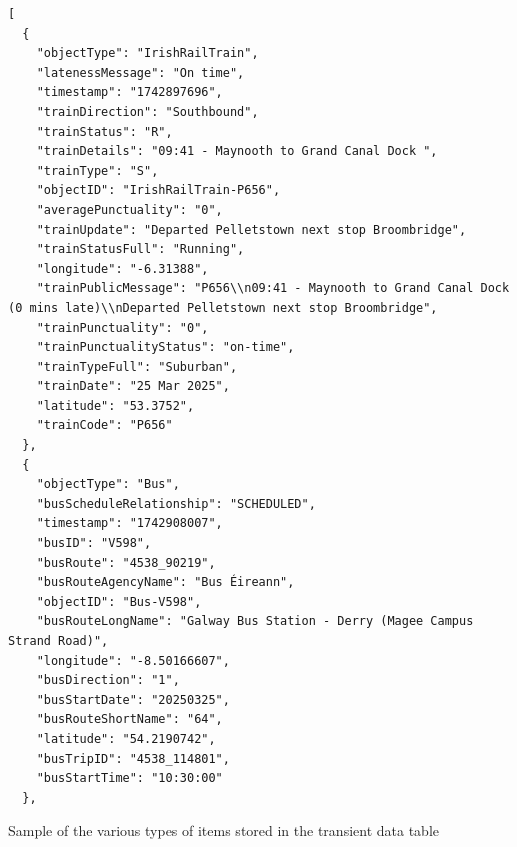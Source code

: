 \documentclass[a4paper,11pt]{report}
\newenvironment{code}{\captionsetup{type=listing}}{}
\begin{document}
\begin{code}
\begin{verbatim}
[
  {
    "objectType": "IrishRailTrain",
    "latenessMessage": "On time",
    "timestamp": "1742897696",
    "trainDirection": "Southbound",
    "trainStatus": "R",
    "trainDetails": "09:41 - Maynooth to Grand Canal Dock ",
    "trainType": "S",
    "objectID": "IrishRailTrain-P656",
    "averagePunctuality": "0",
    "trainUpdate": "Departed Pelletstown next stop Broombridge",
    "trainStatusFull": "Running",
    "longitude": "-6.31388",
    "trainPublicMessage": "P656\\n09:41 - Maynooth to Grand Canal Dock (0 mins late)\\nDeparted Pelletstown next stop Broombridge",
    "trainPunctuality": "0",
    "trainPunctualityStatus": "on-time",
    "trainTypeFull": "Suburban",
    "trainDate": "25 Mar 2025",
    "latitude": "53.3752",
    "trainCode": "P656"
  },
  {
    "objectType": "Bus",
    "busScheduleRelationship": "SCHEDULED",
    "timestamp": "1742908007",
    "busID": "V598",
    "busRoute": "4538_90219",
    "busRouteAgencyName": "Bus Éireann",
    "objectID": "Bus-V598",
    "busRouteLongName": "Galway Bus Station - Derry (Magee Campus Strand Road)",
    "longitude": "-8.50166607",
    "busDirection": "1",
    "busStartDate": "20250325",
    "busRouteShortName": "64",
    "latitude": "54.2190742",
    "busTripID": "4538_114801",
    "busStartTime": "10:30:00"
  },
\end{verbatim}
\caption{Sample of the various types of items stored in the transient data table}
\label{listing:transient_data}
\end{code}
\end{document}
